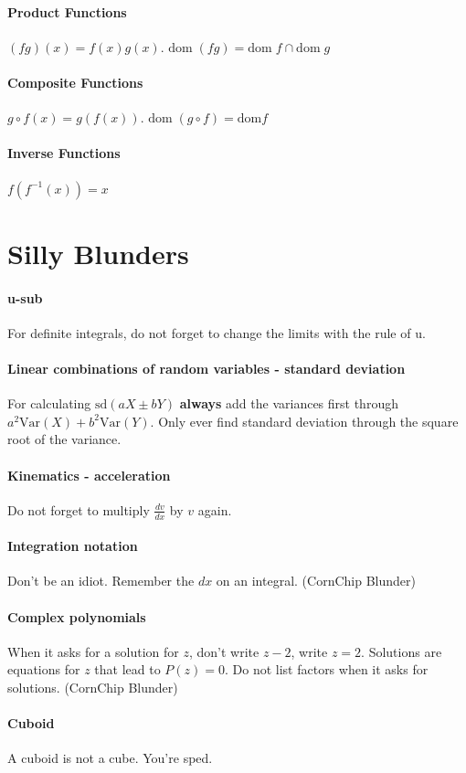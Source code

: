 \documentclass[a4paper,twoside,10pt]{article}
\begin{document}
	\paragraph{Product Functions} $(fg)(x)=f(x)g(x)$. $\mathrm{dom}\;(fg)=\mathrm{dom}\;f\cap\mathrm{dom}\;g$
	\paragraph{Composite Functions} $g\circ f(x)=g(f(x))$. $\mathrm{dom}\;(g\circ f)=\mathrm{dom}f$
	\paragraph{Inverse Functions} $f(f^{-1}(x))=x$
	\newpage
	\section{Silly Blunders}
		\paragraph{u-sub} For definite integrals, do not forget to change the limits with the rule of u.
		\paragraph{Linear combinations of random variables - standard deviation} For calculating $\mathrm{sd}(aX\pm bY)$ \textbf{always} add the variances first through $a^2\mathrm{Var}(X)+b^2\mathrm{Var}(Y)$. Only ever find standard deviation through the square root of the variance.
		\paragraph{Kinematics - acceleration} Do not forget to multiply $\frac{dv}{dx}$ by $v$ again.
		\paragraph{Integration notation} Don't be an idiot. Remember the $dx$ on an integral. (CornChip Blunder)
		\paragraph{Complex polynomials} When it asks for a solution for $z$, don't write $z-2$, write $z=2$. Solutions are equations for $z$ that lead to $P(z)=0$. Do not list factors when it asks for solutions. (CornChip Blunder)
		\paragraph{Cuboid} A cuboid is not a cube. You're sped.
\end{document}
